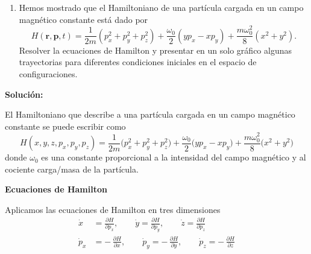 \documentclass{article}
\newenvironment{AGbox}[1][7]%
{%
  \begin{tcolorbox}[
    enhanced, breakable,
    colframe=AppleGreen,
    colback=AppleGreen!#1,
    boxrule=1pt,
    borderline west={2mm}{-10mm}{AppleGreen},
    sharp corners=southwest,
    left=14pt,right=14pt,top=10pt,bottom=10pt,
     boxsep=6pt,
  ]%
}{%
  \end{tcolorbox}%
}
\begin{document}

\begin{AGbox}[8]
\begin{enumerate}[label={{\textcolor{trueblue}{\textbf{Pr.} 4.5}}}]
  \item Hemos mostrado que el Hamiltoniano de una partícula cargada en un campo magnético constante está dado por 
  \[
  H(\mathbf{r},\mathbf{p},t) = \frac{1}{2m}(p_{x}^{2}+p_{y}^{2}+p_{z}^{2}) + \frac{\omega_{0}}{2}(yp_{x}-xp_{y}) + \frac{m\omega_{0}^{2}}{8}(x^{2}+y^{2}).
  \]
  Resolver la ecuaciones de Hamilton y presentar en un solo gráfico algunas trayectorias para diferentes condiciones iniciales en el espacio de configuraciones.
\end{enumerate}
\end{AGbox}
\vspace{0.5cm}

\textcolor{Cinnabar}{\textbf{Solución:}} \vspace{0.5cm}

El Hamiltoniano que describe a una partícula cargada en un campo magnético
constante se puede escribir como
\begin{equation}
H(x,y,z,p_{x},p_{y},p_{z})
=
\frac{1}{2m}\bigl(p_{x}^{2}+p_{y}^{2}+p_{z}^{2}\bigr)
+ \frac{\omega_{0}}{2}\bigl(yp_{x}-xp_{y}\bigr)
+ \frac{m\omega_{0}^{2}}{8}\bigl(x^{2}+y^{2}\bigr)
\label{eq:H-magnetico}
\end{equation}
donde $\omega_{0}$ es una constante proporcional a la intensidad del campo
magnético y al cociente carga/masa de la partícula.

\textcolor{trueblue}{\textbf{Ecuaciones de Hamilton}}

Aplicamos las ecuaciones de Hamilton en tres dimensiones
\begin{equation}
\begin{split}
\dot{x} &= \frac{\partial H}{\partial p_{x}},
\qquad
\dot{y} = \frac{\partial H}{\partial p_{y}},
\qquad
\dot{z} = \frac{\partial H}{\partial p_{z}} \\[4pt]
\dot{p}_{x} &= -\,\frac{\partial H}{\partial x},
\qquad
\dot{p}_{y} = -\,\frac{\partial H}{\partial y},
\qquad
\dot{p}_{z} = -\,\frac{\partial H}{\partial z}
\end{split}
\label{eq:hamilton-3D-general}
\end{equation}
\end{document}
